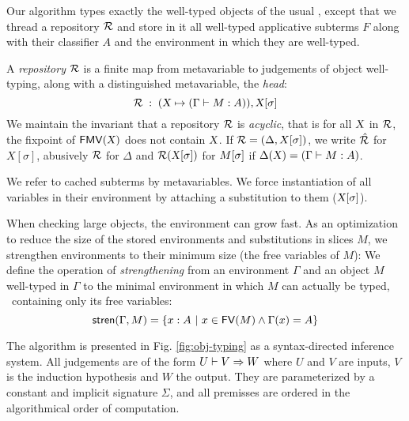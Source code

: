 \documentclass[9pt]{sigplanconf}
\begin{document}
Our algorithm types exactly the well-typed objects of the usual
\LF, except that we thread a repository $\mathcal{R}$ and store in it
all well-typed applicative subterms $F$ along with their classifier
$A$ and the environment in which they are well-typed.


A \emph{repository} $\mathcal{R}$ is a finite map from metavariable to
judgements of object well-typing, along with a distinguished
metavariable, the \emph{head}:
$$ \mathcal{R}\;:\;(\text{\textsl{X}} \mapsto (\Gamma\vdash{M}:{A})), {\text{\textsl{X}}}[{\sigma}] $$
We maintain the invariant that a repository $\mathcal{R}$ is
\emph{acyclic}, that is for all $\text{\textsl{X}}$ in $\mathcal{R}$, the fixpoint
of ${\text{\textsf{FMV}}}({\text{\textsl{X}}})$ does not contain $\text{\textsl{X}}$. If $\mathcal{R} =
(\Delta, X[\sigma])$, we write $\hat {\mathcal{R}}$ for $X[\sigma]$,
abusively $\mathcal{R}$ for $\Delta$ and $\mathcal{R} ({\text{\textsl{X}}}[{\sigma}])$ for
${M}[{\sigma}]$ if $\Delta(\text{\textsl{X}}) = (\Gamma\vdash M : A)$.

We refer to cached subterms by metavariables. We force instantiation
of all variables in their environment by attaching a substitution to
them (${\text{\textsl{X}}}[{\sigma}]$).

When checking large objects, the environment can grow fast. As an
optimization to reduce the size of the stored environments and
substitutions in slices $M$, we strengthen environments to their
minimum size (the free variables of $M$): We define the operation of
\emph{strengthening} from an environment $\Gamma$ and an object $M$
well-typed in $\Gamma$ to the minimal environment in which $M$ can
actually be typed, \ie\ containing only its free variables:
$$
{\text{\textsf{stren}}}({\Gamma,M}) = \{x : A\ |\ x\in {\text{\textsf{FV}}}({M}) \wedge \Gamma(x)=A\}
$$

The algorithm is presented in Fig. \ref{fig:obj-typing} as a
syntax-directed inference system. All judgements are of the form ${U}\vdash{{V}\Rightarrow{W}}$ where $U$ and $V$ are inputs, $V$ is the induction hypothesis
and $W$ the output. They are parameterized by a constant and implicit
signature $\Sigma$, and all premisses are ordered in the algorithmical
order of computation.
\end{document}
